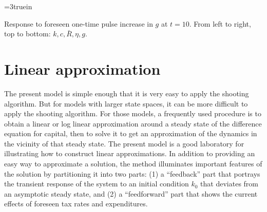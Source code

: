 \centerline{\epsfxsize=3truein}
\caption{Response to foreseen one-time pulse increase in $g$ at $t=10$. From
left to right, top to bottom: $k, c, \bar R, \eta, g$.}
\endfigure
%


\section{Linear approximation}\label{sec:linapproximation}%
   The present model is simple enough that it is very easy
to apply the shooting algorithm. But for models with  larger state
spaces, it can be more difficult to apply the shooting algorithm. For those
models, a frequently used procedure is to obtain a linear or
log linear approximation
around a steady state of the difference equation for capital, then to solve it to get an approximation of
the dynamics in the vicinity of that steady state. The present model
is a good laboratory for illustrating how to construct linear approximations.
 In addition to providing an easy way to
approximate a solution, the method illuminates important features
of the solution by partitioning it into two parts: (1) a ``feedback'' part that portrays the transient
response of the system to an initial condition $k_0$ that deviates
from an  asymptotic steady state, and (2) a ``feedforward'' part
that shows the current effects of foreseen
tax rates and expenditures.

